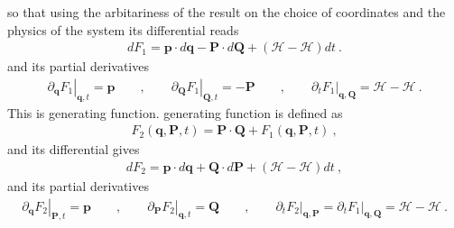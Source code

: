 \documentclass[letterpaper,10pt,english]{jupyterBook}
\begin{document}
\sphinxAtStartPar
so that \sphinxhyphen{} using the arbitariness of the result on the choice of coordinates and the physics of the system \sphinxhyphen{} its differential reads
\begin{equation*}
\begin{split}d F_1 = \mathbf{p} \cdot d \mathbf{q} - \mathbf{P} \cdot d \mathbf{Q} + ( \mathscr{H} - \mathcal{H} ) dt \ .\end{split}
\end{equation*}
\sphinxAtStartPar
and its partial derivatives
\begin{equation}\label{equation:ch/quantum-mechanics/analytical-mechanics:eq:analytics:gen-fun-1:derivatives}
\begin{split}
\left.\partial_{\mathbf{q}} F_1\right|_{\mathbf{q}, t         } = \mathbf{p}
\qquad , \qquad
\left.\partial_{\mathbf{Q}} F_1\right|_{\mathbf{Q}, t         } = -\mathbf{P}
\qquad , \qquad
\left.\partial_{t         } F_1\right|_{\mathbf{q}, \mathbf{Q}} = \mathscr{H} - \mathcal{H} \ .
\end{split}
\end{equation}
\sphinxAtStartPar
This is  generating function.  generating function is defined as
\begin{equation*}
\begin{split}F_2(\mathbf{q}, \mathbf{P}, t) = \mathbf{P} \cdot \mathbf{Q} + F_1(\mathbf{q}, \mathbf{P}, t) \ ,\end{split}
\end{equation*}
\sphinxAtStartPar
and its differential gives
\begin{equation*}
\begin{split}d F_2 = \mathbf{p} \cdot d \mathbf{q} + \mathbf{Q} \cdot d \mathbf{P} + ( \mathscr{H} - \mathcal{H} ) dt \ , \end{split}
\end{equation*}
\sphinxAtStartPar
and its partial derivatives
\begin{equation}\label{equation:ch/quantum-mechanics/analytical-mechanics:eq:analytics:gen-fun-2:derivatives}
\begin{split}
\left.\partial_{\mathbf{q}} F_2\right|_{\mathbf{P}, t} = \mathbf{p}
\qquad , \qquad
\left.\partial_{\mathbf{P}} F_2\right|_{\mathbf{q}, t} = \mathbf{Q}
\qquad , \qquad
\left.\partial_{t         } F_2\right|_{\mathbf{q}, \mathbf{P}} = \left.\partial_t F_1\right|_{\mathbf{q}, \mathbf{Q}} = \mathscr{H} - \mathcal{H} \ .
\end{split}
\end{equation}
\sphinxAtStartPar
{}
\end{document}
